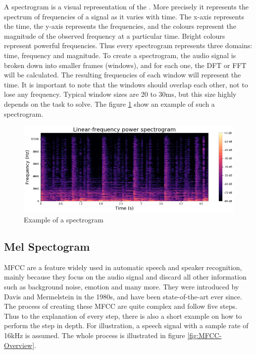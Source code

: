 A spectrogram is a visual representation of the . More precisely it represents the spectrum of frequencies of a signal as it varies with time. The x-axis represents the time, the y-axis represents the frequencies, and the colours represent the magnitude of the observed frequency at a particular time. Bright colours represent powerful frequencies. Thus every spectrogram represents three domains: time, frequency and magnitude.
\newline
\newline
To create a spectrogram, the audio signal is broken down into smaller frames (windows), and for each one, the \gls{DFT} or \gls{FFT} will be calculated. The resulting frequencies of each window will represent the time. It is important to note that the windows should overlap each other, not to lose any frequency. Typical window sizes are 20 to 30ms, but this size highly depends on the task to solve. The figure \ref{fig:Spectrogram} show an example of such a spectrogram.
\begin{figure}[htbp]
	\centering
	\includegraphics[scale=0.5]{baa-documentation/img/Spectrogram_Visualisation.png}
	\caption[Example of a spectrogram]{Example of a spectrogram}
	\label{fig:Spectrogram}
\end{figure}

\subsection{Mel Spectogram}
\label{sub:Mel-Spectogram}

\gls{MFCC} are a feature widely used in automatic speech and speaker recognition, mainly because they focus on the audio signal and discard all other information such as background noise, emotion and many more. They were introduced by Davis and Mermelstein in the 1980s, and have been state-of-the-art ever since.
\newline
\newline
The process of creating these \gls{MFCC} are quite complex and follow five steps. Thus to the explanation of every step, there is also a short example on how to perform the step in depth. For illustration, a speech signal with a sample rate of 16kHz is assumed. The whole process is illustrated in figure \ref{fig:MFCC-Overview}.

